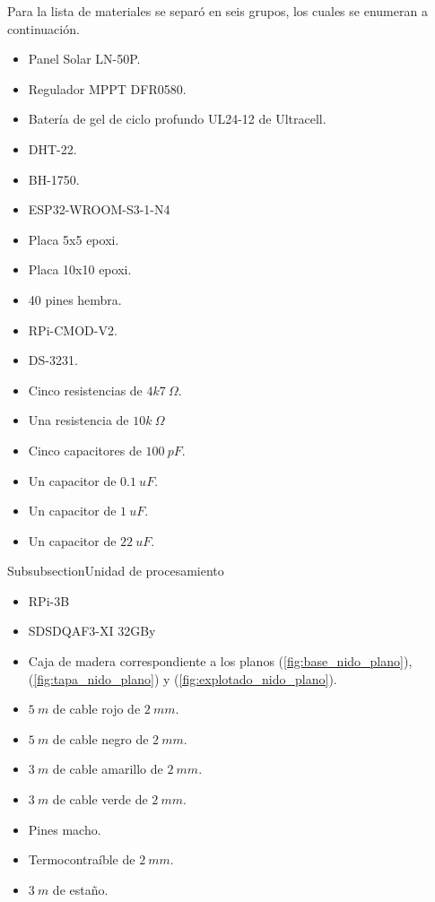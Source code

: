 Para la lista de materiales se separó en seis grupos, los cuales se enumeran a continuación.

\begin{itemize}
	\item Panel Solar LN-50P.
	\item Regulador MPPT DFR0580.
	\item Batería de gel de ciclo profundo UL24-12 de Ultracell.
\end{itemize}

\begin{itemize}
	\item DHT-22.
	\item BH-1750.
	\item ESP32-WROOM-S3-1-N4
	\item Placa 5x5 epoxi.
	\item Placa 10x10 epoxi.
	\item 40 pines hembra.
	\item RPi-CMOD-V2.
	\item DS-3231.
	\item Cinco resistencias de $4k7 \ \Omega$.
	\item Una resistencia de $10k \ \Omega$
	\item Cinco capacitores de $100 \ pF$.
	\item Un capacitor de $0.1 \ uF$.
	\item Un capacitor de $1 \ uF$.
	\item Un capacitor de $22 \ uF$.
\end{itemize}

Subsubsection{Unidad de procesamiento}
\begin{itemize}
	\item RPi-3B
	\item SDSDQAF3-XI 32GBy
\end{itemize}

\begin{itemize}
	\item Caja de madera correspondiente a los planos (\ref{fig:base_nido_plano}), (\ref{fig:tapa_nido_plano}) y (\ref{fig:explotado_nido_plano}).
\end{itemize}

\begin{itemize}
	\item $5 \ m$ de cable rojo de $2 \ mm$.
	\item $5 \ m$ de cable negro de $2 \ mm$.
	\item $3 \ m$ de cable amarillo de $2 \ mm$.
	\item $3 \ m$ de cable verde de $2 \ mm$.
	\item Pines macho.
	\item Termocontraíble de $2 \ mm$.
	\item $3  \ m$ de estaño.
\end{itemize}










